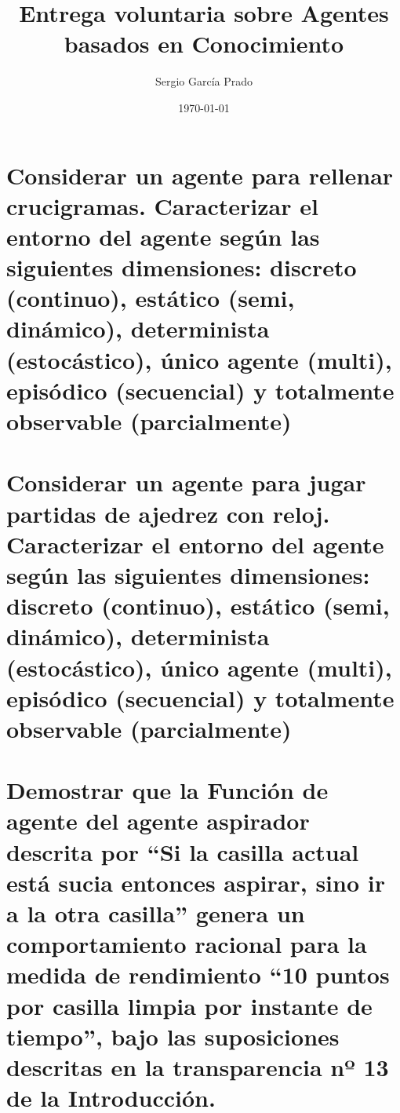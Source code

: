 \documentclass[10pt, a4paper,spanish]{article}
\title{\vspace{-15mm}\fontsize{24pt}{10pt}\selectfont\textbf{Entrega voluntaria sobre Agentes basados en Conocimiento}} %
\author{Sergio García Prado}
\date{\today}
\begin{document}
	\maketitle %

	\thispagestyle{fancy} %


	\section{Considerar un agente para rellenar crucigramas. Caracterizar el entorno del agente según las siguientes dimensiones: discreto (continuo), estático (semi, dinámico), determinista (estocástico), único agente (multi), episódico (secuencial) y totalmente observable (parcialmente)}

		\paragraph{}



	\section{Considerar un agente para jugar partidas de ajedrez con reloj. Caracterizar el entorno del agente según las siguientes dimensiones: discreto (continuo), estático (semi, dinámico), determinista (estocástico), único agente (multi), episódico (secuencial) y totalmente observable (parcialmente)}

		\paragraph{}



	\section{Demostrar que la Función de agente del agente aspirador descrita por “Si la casilla actual está sucia entonces aspirar, sino ir a la otra casilla” genera un comportamiento racional para la medida de rendimiento “10 puntos por casilla limpia por instante de tiempo”, bajo las suposiciones descritas en la transparencia nº 13 de la Introducción.}

		\paragraph{}
\end{document}
